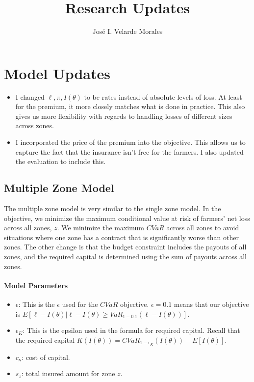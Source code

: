 \documentclass[11pt]{article}
\title{Research Updates}
\author{José I. Velarde Morales}
\begin{document}
\maketitle

\section{Model Updates}
\begin{itemize}
    \item I changed $\ell,\pi, I(\theta)$ to be rates instead of absolute levels of loss. At least for the premium, it more closely matches what is done in practice. This also gives us more flexibility with regards to handling losses of different sizes across zones. 
    \item I incorporated the price of the premium into the objective. This allows us to capture the fact that the insurance isn't free for the farmers. I also updated the evaluation to include this. 
\end{itemize}

\subsection{Multiple Zone Model}
The multiple zone model is very similar to the single zone model. In the objective, we minimize the maximum conditional value at risk of  farmers' net loss across all zones, $z$. We minimize the maximum $CVaR$ across all zones to avoid situations where one zone has a contract that is significantly worse than other zones. The other change is that the budget constraint includes the payouts of all zones, and the required capital is determined using the sum of payouts across all zones.
  \paragraph*{Model Parameters}
  \begin{itemize}
      \item $\epsilon$: This is the $\epsilon$ used for the $CVaR$ objective.  $\epsilon = 0.1$ means that our objective is $E[\ell - I(\theta)|\ell -I(\theta) \geq VaR_{1-0.1}\left ( \ell - I(\theta) \right )]$.  
      \item $\epsilon_K$: This is the epsilon used in the formula for required capital. Recall that the required capital $K(I(\theta)) = CVaR_{1-\epsilon_K}(I(\theta)) - E[I(\theta)]$. 
      \item $c_{\kappa}$: cost of capital. 
      \item $s_z$: total insured amount for zone $z$.
  \end{itemize}
\end{document}
